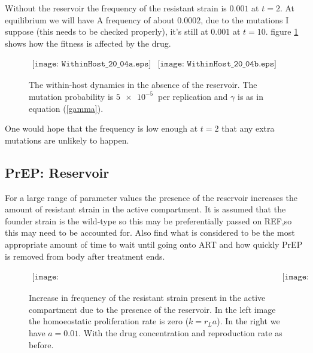\documentclass[DIV=15]{scrartcl}
\begin{document}
\fi
 Without the reservoir the frequency of the resistant strain  is $0.001$  at $t=2$. At equilibrium we will have A frequency of about $0.0002$, due to the mutations I suppose (this needs to be checked properly),  it's still at $0.001$ at $t=10$. figure \ref{freqwithoutres} shows how the  fitness is affected by the drug.
\begin{figure}[h]
 \begin{center}$
 \begin{array}{cc}
 \texttt{[image: WithinHost\_20\_04a.eps]} &
 \texttt{[image: WithinHost\_20\_04b.eps]}
 \end{array}$
 \end{center}
 \caption{The within-host dynamics in the  absence of the reservoir. The mutation probability is $\SI{5e-5}{}$ per replication and $ \gamma $ is as in equation (\ref{gamma}).}
 \label{freqwithoutres}
 \end{figure}
 One would hope that the frequency is low enough at $t=2$ that any extra mutations are unlikely to happen.
 
 \subsection*{PrEP: Reservoir}

For a large range of parameter values the presence of the reservoir increases the amount of resistant strain in the active compartment. It is assumed that the founder strain is the wild-type so this may be preferentially passed on REF,so this may need to be accounted for. Also find what is considered to be the most appropriate amount of time to wait until going onto ART and how quickly PrEP is removed from body after treatment ends.
\begin{figure}[h]
 \begin{center}$
 \begin{array}{cc}
 \texttt{[image: FrequencyofResistantStraininActiveCompartment\_20\_04a.jpg]} &
 \texttt{[image: FrequencyofResistantStraininActiveCompartment\_20\_04b.jpg]}
 \end{array}$
 \end{center}
 \caption{Increase in frequency of  the resistant strain present in the active compartment due to the presence of the reservoir. In the left image the homoeostatic proliferation rate is zero ($k = r_L a$). In the right we have $a = 0.01$. With the drug concentration and reproduction rate as before.}
 \label{freqwithres}
 \end{figure}
\end{document}
